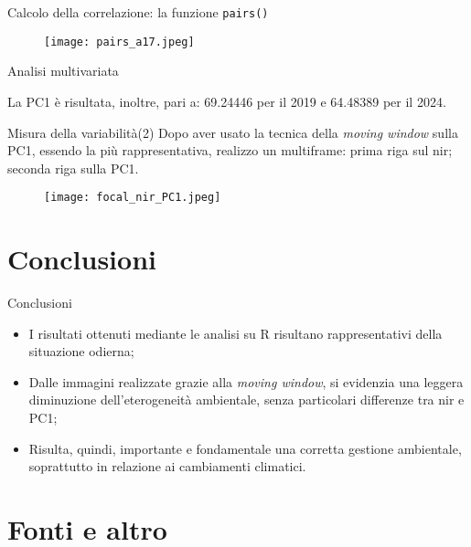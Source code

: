 \documentclass{beamer} %
\begin{document}
\begin{frame}{Calcolo della correlazione: la funzione \texttt{pairs()} }
    
    \begin{figure}
        \centering
        \texttt{[image: pairs\_a17.jpeg]}
    \end{figure}
\end{frame}

\begin{frame}{Analisi multivariata}
    
    \bigskip
    La PC1 è risultata, inoltre, pari a: 69.24446 per il 2019 e 64.48389 per il 2024.
    \end{frame}

\begin{frame}{Misura della variabilità(2)}
    Dopo aver usato la tecnica della \textit{moving window} sulla PC1, essendo la più rappresentativa, realizzo un multiframe: prima riga sul nir; seconda riga sulla PC1.
    \begin{figure}
        \centering
        \texttt{[image: focal\_nir\_PC1.jpeg]}
    \end{figure}
\end{frame}

\section{Conclusioni}
\begin{frame}{Conclusioni}
    \begin{itemize}
        \item 
I risultati ottenuti mediante le analisi su R risultano rappresentativi della situazione odierna;
\bigskip
       \pause \item 
Dalle immagini realizzate grazie alla \textit{moving window}, si evidenzia una leggera diminuzione dell'eterogeneità ambientale, senza particolari differenze tra nir e PC1;
       \pause \item 
\bigskip
Risulta, quindi, importante e fondamentale una corretta gestione ambientale, soprattutto in relazione ai cambiamenti climatici.
    \end{itemize}
\end{frame}

\section{Fonti e altro}
\end{document}
